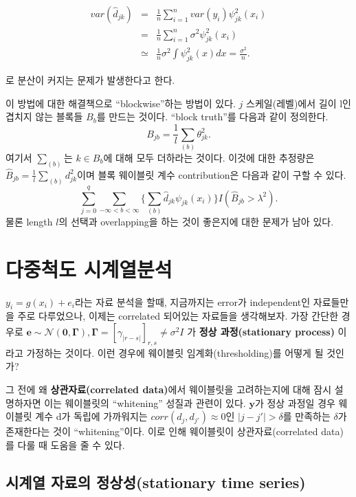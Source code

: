 \documentclass[b5paper,]{scrbook}
\theoremstyle{plain}
\theoremstyle{definition}
\numberwithin{equation}{section}
\begin{document}
\begin{eqnarray*}
var(\hat{d}_{jk})&=&\frac{1}{n}\sum_{i=1}^{n}var(y_{i})\psi_{jk}^{2}(x_{i})\\
&=&\frac{1}{n}\sum_{i=1}^{n}\sigma^{2}\psi_{jk}^{2}(x_{i})\\
&\simeq& \frac{1}{n}\sigma^{2}\int \psi_{jk}^{2}(x)dx=\frac{\sigma^{2}}{n}.
\end{eqnarray*}

로 분산이 커지는 문제가 발생한다고 한다.

이 방법에 대한 해결책으로 ``blockwise''하는 방법이 있다. \(j\)
스케일(레벨)에서 길이 l인 겹치지 않는 블록들 \(B_{b}\)를 만드는 것이다.
``block truth''를 다음과 같이 정의한다.
\[B_{jb}=\frac{1}{l}\sum_{(b)}\theta_{jk}^{2}.\] 여기서 \(\sum_{(b)}\)는
\(k \in B_{b}\)에 대해 모두 더하라는 것이다. 이것에 대한 추정량은
\(\hat{B}_{jb}=\frac{1}{l}\sum_{(b)}d_{jk}^{2}\)이며 블록 웨이블릿 계수
contribution은 다음과 같이 구할 수 있다.
\[\sum_{j=0}^{q}\sum_{-\infty < b < \infty} \{ \sum_{(b)}\hat{d}_{jk}\psi_{jk}(x_{i})\}I(\hat{B}_{jb} > \lambda^{2}).\]
물론 length \(l\)의 선택과 overlapping을 하는 것이 좋은지에 대한 문제가
남아 있다.

\chapter{다중척도 시계열분석}\label{multiscalets}

\(y_{i}=g(x_{i})+e_{i}\)라는 자료 분석을 할때, 지금까지는 error가
independent인 자료들만을 주로 다루었으나, 이제는 correlated 되어있는
자료들을 생각해보자. 가장 간단한 경우로
\(\mathbf{e} \sim \mathcal{N}(\mathbf{0},\boldsymbol{\Gamma}), \boldsymbol{\Gamma}=[ \gamma_{|r-s|}]_{r,s} \neq \sigma^{2}I\)
가 \textbf{정상 과정(stationary process)} 이라고 가정하는 것이다. 이런
경우에 웨이블릿 임계화(thresholding)를 어떻게 될 것인가?

그 전에 왜 \textbf{상관자료(correlated data)}에서 웨이블릿을
고려하는지에 대해 잠시 설명하자면 이는 웨이블릿의 ``whitening'' 성질과
관련이 있다. \(\mathbf{y}\)가 정상 과정일 경우 웨이블릿 계수 d가 독립에
가까워지는 \(corr(d_{j},d_{j'})\approx 0\)인 \(|j-j'|>\delta\)를
만족하는 \(\delta\)가 존재한다는 것이 ``whitening''이다. 이로 인해
웨이블릿이 상관자료(correlated data)를 다룰 때 도움을 줄 수 있다.

\section{시계열 자료의 정상성(stationary time
series)}\label{--stationary-time-series}
\end{document}
